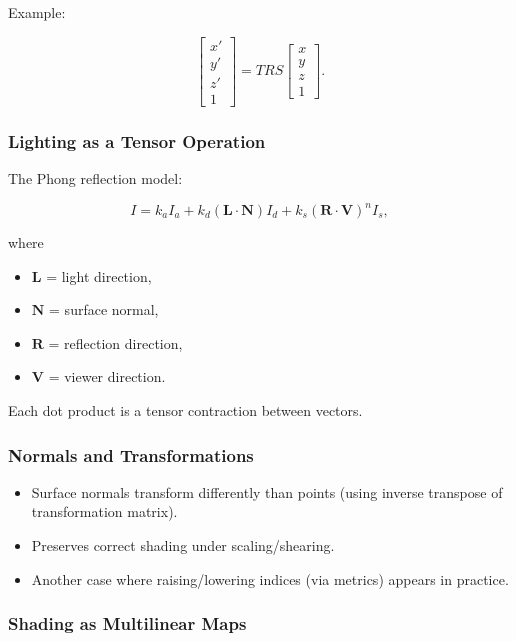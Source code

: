 \documentclass[
  letterpaper,
  DIV=11,
  numbers=noendperiod]{scrreprt}
\providecommand{\tightlist}{%
  \setlength{\itemsep}{0pt}\setlength{\parskip}{0pt}}
\begin{document}
Example:

\[
\begin{bmatrix}
x' \\ y' \\ z' \\ 1
\end{bmatrix}
= T R S
\begin{bmatrix}
x \\ y \\ z \\ 1
\end{bmatrix}.
\]

\subsubsection{Lighting as a Tensor
Operation}\label{lighting-as-a-tensor-operation}

The Phong reflection model:

\[
I = k_a I_a + k_d (\mathbf{L} \cdot \mathbf{N}) I_d + k_s (\mathbf{R} \cdot \mathbf{V})^n I_s,
\]

where

\begin{itemize}
\tightlist
\item
  \(\mathbf{L}\) = light direction,
\item
  \(\mathbf{N}\) = surface normal,
\item
  \(\mathbf{R}\) = reflection direction,
\item
  \(\mathbf{V}\) = viewer direction.
\end{itemize}

Each dot product is a tensor contraction between vectors.

\subsubsection{Normals and
Transformations}\label{normals-and-transformations}

\begin{itemize}
\tightlist
\item
  Surface normals transform differently than points (using inverse
  transpose of transformation matrix).
\item
  Preserves correct shading under scaling/shearing.
\item
  Another case where raising/lowering indices (via metrics) appears in
  practice.
\end{itemize}

\subsubsection{Shading as Multilinear
Maps}\label{shading-as-multilinear-maps}
\end{document}
